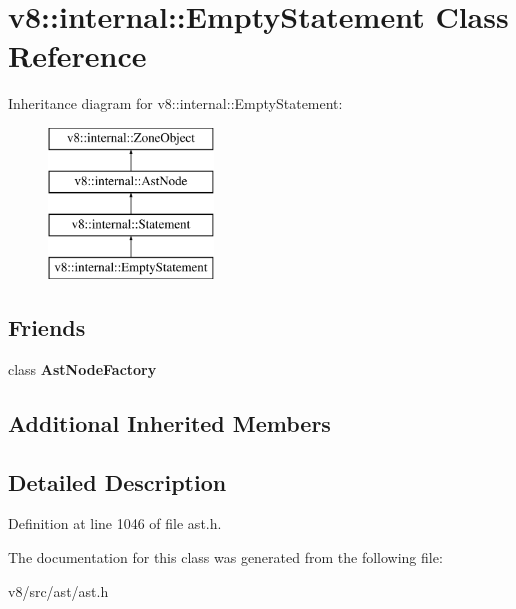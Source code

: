 \hypertarget{classv8_1_1internal_1_1EmptyStatement}{}\section{v8\+:\+:internal\+:\+:Empty\+Statement Class Reference}
\label{classv8_1_1internal_1_1EmptyStatement}
Inheritance diagram for v8\+:\+:internal\+:\+:Empty\+Statement\+:\begin{figure}[H]
\begin{center}
\leavevmode
\includegraphics[height=4.000000cm]{classv8_1_1internal_1_1EmptyStatement}
\end{center}
\end{figure}
\subsection*{Friends}
\begin{DoxyCompactItemize}
\item 
\mbox{\label{classv8_1_1internal_1_1EmptyStatement_a8d587c8ad3515ff6433eb83c578e795f}} 
class {\bfseries Ast\+Node\+Factory}
\end{DoxyCompactItemize}
\subsection*{Additional Inherited Members}


\subsection{Detailed Description}


Definition at line 1046 of file ast.\+h.



The documentation for this class was generated from the following file\+:\begin{DoxyCompactItemize}
\item 
v8/src/ast/ast.\+h\end{DoxyCompactItemize}
